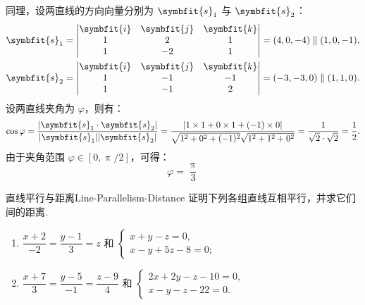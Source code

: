 \begin{solution}
    同理，设两直线的方向向量分别为 $\symbfit{s}_1$ 与 $\symbfit{s}_2$：
    \begin{equation}
        \begin{aligned}
            \symbfit{s}_1 & = \begin{vmatrix} \symbfit{i} & \symbfit{j} & \symbfit{k} \\ 1 & 2 & 1 \\ 1 & -2 & 1 \end{vmatrix} = (4, 0, -4) \parallel (1, 0, -1),   \\
            \symbfit{s}_2 & = \begin{vmatrix} \symbfit{i} & \symbfit{j} & \symbfit{k} \\ 1 & -1 & -1 \\ 1 & -1 & 2 \end{vmatrix} = (-3, -3, 0) \parallel (1, 1, 0).
        \end{aligned}
    \end{equation}
    设两直线夹角为 $\varphi$，则有：
    \begin{equation}
        \cos \varphi = \frac{|\symbfit{s}_1 \cdot \symbfit{s}_2|}{|\symbfit{s}_1| |\symbfit{s}_2|} = \frac{|1 \times 1 + 0 \times 1 + (-1) \times 0|}{\sqrt{1^2 + 0^2 + (-1)^2} \sqrt{1^2 + 1^2 + 0^2}} = \frac{1}{\sqrt{2} \cdot \sqrt{2}} = \frac{1}{2}.
    \end{equation}
    由于夹角范围 $\varphi \in [0, \uppi/2]$，可得：
    \begin{equation}
        \boxed{\varphi = \frac{\uppi}{3}}
    \end{equation}
\end{solution}


\begin{problem}{直线平行与距离}{Line-Parallelism-Distance}
    证明下列各组直线互相平行，并求它们间的距离.
    \begin{enumerate}
        \item $\dfrac{x+2}{-2} = \dfrac{y-1}{3} = z$ 和 $\begin{cases} x + y - z = 0, \\ x - y + 5z - 8 = 0; \end{cases}$
        \item $\dfrac{x+7}{3} = \dfrac{y-5}{-1} = \dfrac{z-9}{4}$ 和 $\begin{cases} 2x + 2y - z - 10 = 0, \\ x - y - z - 22 = 0. \end{cases}$
    \end{enumerate}
\end{problem}

